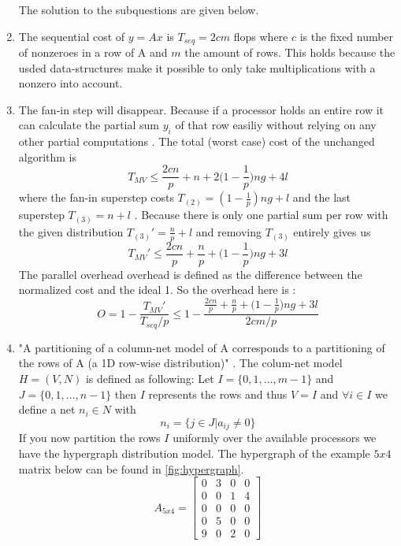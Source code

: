 \documentclass[../main.tex]{subfiles}
\begin{document}
\begin{solution}
\begin{enumerate} The solution to the subquestions are given below.
		\item The sequential cost of $y=Ax$ is $T_{seq} = 2cm$ flops \cite[p.~166]{bisseling04} where $c$ is the fixed number of nonzeroes in a row of A and $m$ the amount of rows. This holds because the usded data-structures make it possible to only take multiplications with a nonzero into account.
		\item The fan-in step will disappear. Because if a processor holds an entire row it can calculate the partial sum $y_i$ of that row easiliy without relying on any other partial computations \cite[p.~176]{bisseling04}.  The total (worst case) cost of the unchanged algorithm is 
				$$T_{MV} \leq \frac{2cn}{p} + n + 2 \Big( 1 - \frac{1}{p} \Big) ng + 4l $$
				where the fan-in superstep costs $T_{(2)} = (1-\frac{1}{p})ng + l$ and the last superstep $T_{(3)} = n + l $ \cite[p.~178]{bisseling04}. Because there is only one partial sum per row with the given distribution $T_{(3)}' = \frac{n}{p} + l $ and removing $T_{(3)}$ entirely gives us 
				$$T_{MV}' \leq \frac{2cn}{p} + \frac{n}{p} + \Big(1 - \frac{1}{p} \Big) ng + 3l $$
				The parallel overhead overhead is defined as the difference between the normalized cost and the ideal 1. So the overhead here is \cite[p.~141]{bisseling04}:
		$$O = 1 - \frac{T_{MV}'}{T_{seq}/p} \leq 1 - \frac{\frac{2cn}{p} + \frac{n}{p} + \Big(1 - \frac{1}{p} \Big) ng + 3l}{2cm/p}$$
		\item "A partitioning of a column-net model of A corresponds to a partitioning of the rows of A (a 1D row-wise distribution)" \cite{slides6}. The colum-net model $H=(V,N)$ is defined as following: Let $I = \{0,1,\ldots,m-1\}$ and $J = \{0,1,\ldots,n-1\}$ then $I$ represents the rows and thus $V = I$ and $\forall i \in I$ we define a net $n_i \in N$ with  
			$$ n_i = \{j \in J | a_{ij} \neq 0\} $$
			If you now partition the rows $I$ uniformly over the available processors we have the hypergraph distribution model. The hypergraph of the example $5x4$ matrix below can be found in \autoref{fig:hypergraph}.
			$$ A_{5x4} = \begin{bmatrix}
					0 & 3 & 0 & 0 \\
					0 & 0 & 1 & 4 \\
					0 & 0 & 0 & 0 \\
					0 & 5 & 0 & 0 \\
					9 & 0 & 2 & 0
			\end{bmatrix}$$

\end{enumerate}
\end{solution}
\end{document}
